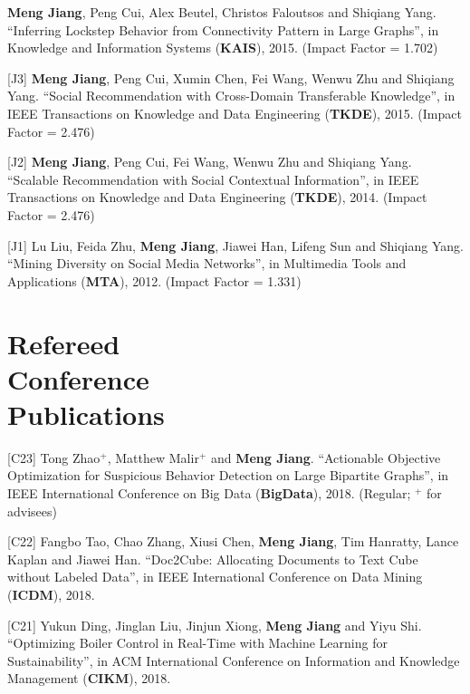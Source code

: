 \documentclass[margin, 9pt]{res}
\begin{document}
\begin{resume}
[J4] \textbf{Meng Jiang}, Peng Cui, Alex Beutel, Christos Faloutsos and Shiqiang Yang. ``Inferring Lockstep Behavior from Connectivity Pattern in Large Graphs'', in Knowledge and Information Systems (\textbf{KAIS}), 2015. (Impact Factor = 1.702)

[J3] \textbf{Meng Jiang}, Peng Cui, Xumin Chen, Fei Wang, Wenwu Zhu and Shiqiang Yang. ``Social Recommendation with Cross-Domain Transferable Knowledge'', in IEEE Transactions on Knowledge and Data Engineering (\textbf{TKDE}), 2015. (Impact Factor = 2.476)

[J2] \textbf{Meng Jiang}, Peng Cui, Fei Wang, Wenwu Zhu and Shiqiang Yang. ``Scalable Recommendation with Social Contextual Information'', in IEEE Transactions on Knowledge and Data Engineering (\textbf{TKDE}), 2014. (Impact Factor = 2.476)

[J1] Lu Liu, Feida Zhu, \textbf{Meng Jiang}, Jiawei Han, Lifeng Sun and Shiqiang Yang. ``Mining Diversity on Social Media Networks'', in Multimedia Tools and Applications (\textbf{MTA}), 2012. (Impact Factor = 1.331)


\section{Refereed \\ Conference \\ Publications}

[C23] Tong Zhao${}^{+}$, Matthew Malir${}^{+}$ and \textbf{Meng Jiang}. ``Actionable Objective Optimization for Suspicious Behavior Detection on Large Bipartite Graphs'', in IEEE International Conference on Big Data (\textbf{BigData}), 2018. (Regular; ${}^{+}$ for advisees)

[C22] Fangbo Tao, Chao Zhang, Xiusi Chen, \textbf{Meng Jiang}, Tim Hanratty, Lance Kaplan and Jiawei Han. ``Doc2Cube: Allocating Documents to Text Cube without Labeled Data'', in IEEE International Conference on Data Mining (\textbf{ICDM}), 2018.

[C21] Yukun Ding, Jinglan Liu, Jinjun Xiong, \textbf{Meng Jiang} and Yiyu Shi. ``Optimizing Boiler Control in Real-Time with Machine Learning for Sustainability'', in ACM International Conference on Information and Knowledge Management (\textbf{CIKM}), 2018.


\end{resume}
\end{document}
